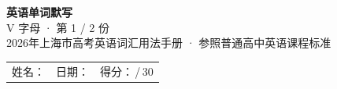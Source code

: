 \documentclass[10pt,a4paper]{article}
\begin{document}
\pagestyle{plain}

\begin{center}
{\LARGE\bfseries 英语单词默写}\\[0.22em]
{\large V 字母 · 第 1 / 2 份}\\[0.18em]
{\small 2026年上海市高考英语词汇用法手册 · 参照普通高中英语课程标准}
\end{center}

\vspace{0.25em}
\noindent\begin{tabular}{@{}p{}@{}p{}@{}p{}@{}}
姓名：\underline{\hspace{2.0cm}} & 日期：\underline{\hspace{2.0cm}} & 得分：\underline{\hspace{1.3cm}}\,/\,30 \\
\end{tabular}

\vspace{0.3em}

\vspace{0.08em}
\end{document}
